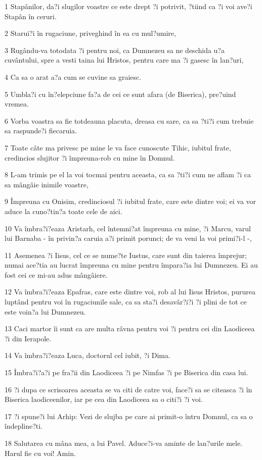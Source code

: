 \par 1 Stapânilor, da?i slugilor voastre ce este drept ?i potrivit, ?tiind ca ?i voi ave?i Stapân în ceruri.
\par 2 Starui?i în rugaciune, priveghind în ea cu mul?umire,
\par 3 Rugându-va totodata ?i pentru noi, ca Dumnezeu sa ne deschida u?a cuvântului, spre a vesti taina lui Hristos, pentru care ma ?i gasesc în lan?uri,
\par 4 Ca sa o arat a?a cum se cuvine sa graiesc.
\par 5 Umbla?i cu în?elepciune fa?a de cei ce sunt afara (de Biserica), pre?uind vremea.
\par 6 Vorba voastra sa fie totdeauna placuta, dreasa cu sare, ca sa ?ti?i cum trebuie sa raspunde?i fiecaruia.
\par 7 Toate câte ma privesc pe mine le va face cunoscute Tihic, iubitul frate, credincios slujitor ?i împreuna-rob cu mine în Domnul.
\par 8 L-am trimis pe el la voi tocmai pentru aceasta, ca sa ?ti?i cum ne aflam ?i ca sa mângâie inimile voastre,
\par 9 Împreuna cu Onisim, credinciosul ?i iubitul frate, care este dintre voi; ei va vor aduce la cuno?tin?a toate cele de aici.
\par 10 Va îmbra?i?eaza Aristarh, cel întemni?at împreuna cu mine, ?i Marcu, varul lui Barnaba - în privin?a caruia a?i primit porunci; de va veni la voi primi?i-l -,
\par 11 Asemenea ?i Iisus, cel ce se nume?te Iustus, care sunt din taierea împrejur; numai ace?tia au lucrat împreuna cu mine pentru împara?ia lui Dumnezeu. Ei au fost cei ce mi-au adus mângâiere.
\par 12 Va îmbra?i?eaza Epafras, care este dintre voi, rob al lui Iisus Hristos, pururea luptând pentru voi în rugaciunile sale, ca sa sta?i desavâr?i?i ?i plini de tot ce este voin?a lui Dumnezeu.
\par 13 Caci martor îi sunt ca are multa râvna pentru voi ?i pentru cei din Laodiceea ?i din Ierapole.
\par 14 Va îmbra?i?eaza Luca, doctorul cel iubit, ?i Dima.
\par 15 Îmbra?i?a?i pe fra?ii din Laodiceea ?i pe Nimfas ?i pe Biserica din casa lui.
\par 16 ?i dupa ce scrisoarea aceasta se va citi de catre voi, face?i sa se citeasca ?i în Biserica laodiceenilor, iar pe cea din Laodiceea sa o citi?i ?i voi.
\par 17 ?i spune?i lui Arhip: Vezi de slujba pe care ai primit-o întru Domnul, ca sa o îndepline?ti.
\par 18 Salutarea cu mâna mea, a lui Pavel. Aduce?i-va aminte de lan?urile mele. Harul fie cu voi! Amin.


